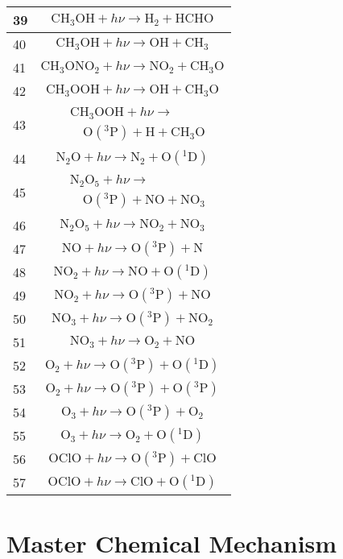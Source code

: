 \begin{longtable}{| m{} | m{} |}
\hline
 39 & $$ \mathrm{CH_3OH} + h\nu\longrightarrow \mathrm{H_2} + \mathrm{HCHO} $$\\
\hline
 40 & $$ \mathrm{CH_3OH} + h\nu\longrightarrow \mathrm{OH} + \mathrm{CH_3} $$\\
\hline
 41 & $$ \mathrm{CH_3ONO_2} + h\nu\longrightarrow \mathrm{NO_2} + \mathrm{CH_3O} $$\\
\hline
 42 & $$ \mathrm{CH_3OOH} + h\nu\longrightarrow \mathrm{OH} + \mathrm{CH_3O} $$\\
\hline
 43 & $$
\begin{aligned}
&\mathrm{CH_3OOH} + h\nu \longrightarrow \\
&\quad \mathrm{O(^3P)} + \mathrm{H} + \mathrm{CH_3O}
\end{aligned}
$$\\
\hline
 44 & $$ \mathrm{N_2O} + h\nu\longrightarrow \mathrm{N_2} + \mathrm{O(^1D)} $$\\
\hline
 45 & $$
\begin{aligned}
&\mathrm{N_2O_5} + h\nu \longrightarrow \\
&\quad \mathrm{O(^3P)} + \mathrm{NO} + \mathrm{NO_3}
\end{aligned}
$$\\
\hline
 46 & $$ \mathrm{N_2O_5} + h\nu\longrightarrow \mathrm{NO_2} + \mathrm{NO_3} $$\\
\hline
 47 & $$ \mathrm{NO} + h\nu\longrightarrow \mathrm{O(^3P)} + \mathrm{N} $$\\
\hline
 48 & $$ \mathrm{NO_2} + h\nu\longrightarrow \mathrm{NO} + \mathrm{O(^1D)} $$\\
\hline
 49 & $$ \mathrm{NO_2} + h\nu\longrightarrow \mathrm{O(^3P)} + \mathrm{NO} $$\\
\hline
 50 & $$ \mathrm{NO_3} + h\nu\longrightarrow \mathrm{O(^3P)} + \mathrm{NO_2} $$\\
\hline
 51 & $$ \mathrm{NO_3} + h\nu\longrightarrow \mathrm{O_2} + \mathrm{NO} $$\\
\hline
 52 & $$ \mathrm{O_2} + h\nu\longrightarrow \mathrm{O(^3P)} + \mathrm{O(^1D)} $$\\
\hline
 53 & $$ \mathrm{O_2} + h\nu\longrightarrow \mathrm{O(^3P)} + \mathrm{O(^3P)} $$\\
\hline
 54 & $$ \mathrm{O_3} + h\nu\longrightarrow \mathrm{O(^3P)} + \mathrm{O_2} $$\\
\hline
 55 & $$ \mathrm{O_3} + h\nu\longrightarrow \mathrm{O_2} + \mathrm{O(^1D)} $$\\
\hline
 56 & $$ \mathrm{OClO} + h\nu\longrightarrow \mathrm{O(^3P)} + \mathrm{ClO} $$\\
\hline
 57 & $$ \mathrm{OClO} + h\nu\longrightarrow \mathrm{ClO} + \mathrm{O(^1D)} $$\\
\hline
\end{longtable}





\section{Master Chemical Mechanism}
